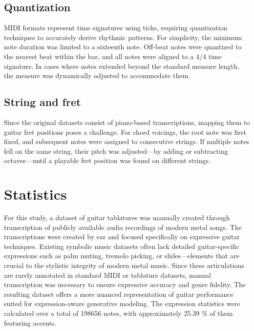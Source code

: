 \documentclass[twoside,11pt]{article}
\begin{document}
\subsection{Quantization}
MIDI formats represent time signatures using ticks, requiring 
quantization techniques to accurately derive rhythmic patterns. For simplicity, 
the minimum note duration was limited to a sixteenth note. Off-beat notes were
quantized to the nearest beat within the bar, and all notes were aligned to 
a 4/4 time signature. In cases where notes extended beyond the standard 
measure length, the measure was dynamically adjusted to accommodate them.

\subsection{String and fret}
Since the original datasets consist of piano-based transcriptions, mapping 
them to guitar fret positions poses a challenge. For chord voicings, the root
note was first fixed, and subsequent notes were assigned to consecutive 
strings. If multiple notes fell on the same string, their pitch was adjusted—by 
adding or subtracting octaves—until a playable fret position was found on 
different strings.

\section{Statistics}

For this study, a dataset of guitar tablatures was manually 
created through transcription of publicly available audio 
recordings of modern metal songs. The transcriptions were 
created by ear and focused specifically on expressive guitar 
techniques. Existing symbolic music datasets often lack 
detailed guitar-specific expressions such as palm muting, 
tremolo picking, or slides—elements that are crucial to the 
stylistic integrity of modern metal music. Since these 
articulations are rarely annotated in standard MIDI or 
tablature datasets, manual transcription was necessary to 
ensure expressive accuracy and genre fidelity. The resulting 
dataset offers a more nuanced representation of guitar 
performance suited for expression-aware generative modeling.
The expression statistics were calculated over a total of 198656 notes, with approximately 25.39 \% 
of them featuring accents.
\end{document}
